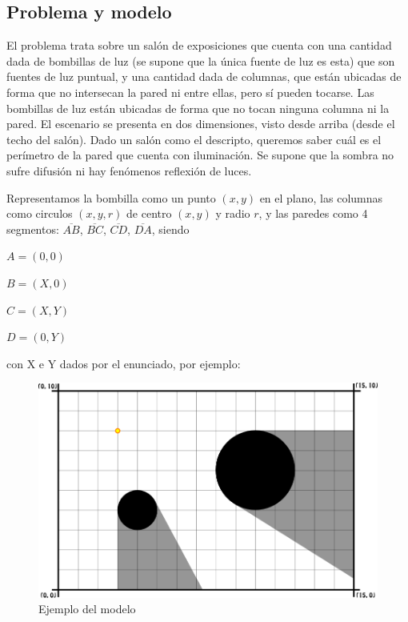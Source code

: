 \subsection*{Problema y modelo}
El problema trata sobre un salón de exposiciones que cuenta con una cantidad dada de
bombillas de luz (se supone que la única fuente de luz es esta) que son fuentes de
luz puntual, y una cantidad dada de columnas, que están ubicadas de forma que no
intersecan la pared ni entre ellas, pero sí pueden tocarse. Las bombillas de luz están
ubicadas de forma que no tocan ninguna columna ni la pared. El escenario se presenta
en dos dimensiones, visto desde arriba (desde el techo del salón). Dado un salón como
el descripto, queremos saber cuál es el perímetro de la pared que cuenta con iluminación.
Se supone que la sombra no sufre difusión ni hay fenómenos reflexión de luces.

Representamos la bombilla como un punto $(x,y)$ en el plano, las columnas como circulos
$(x,y,r)$ de centro $(x,y)$ y radio $r$, y las paredes como 4 segmentos: $\overline{AB}$,
$\overline{BC}$, $\overline{CD}$, $\overline{DA}$, siendo

\vspace{0.2cm}
$A = (0, 0)$

$B = (X, 0)$

$C = (X, Y)$

$D = (0, Y)$
\vspace{0.2cm}

con X e Y dados por el enunciado, por ejemplo:

\begin{figure}[H]
\centering
\label{bl_1}
\includegraphics[scale=1.0]{./figuras/bl_1.png}
\caption{Ejemplo del modelo}
\end{figure} 


